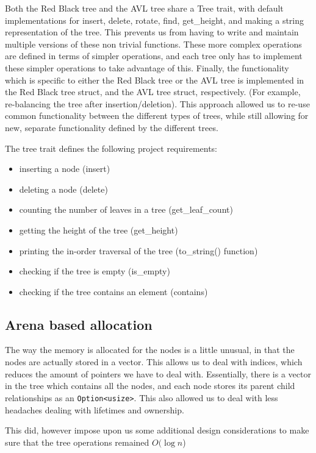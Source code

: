 \documentclass[letterpaper]{article}
\begin{document}
Both the Red Black tree and the AVL tree share a Tree trait, with
default implementations for insert, delete, rotate, find, get\_height,
and making a string representation of the tree. This prevents us from
having to write and maintain multiple versions of these non trivial
functions. These more complex operations are defined in terms of
simpler operations, and each tree only has to implement these simpler
operations to take advantage of this. Finally, the functionality which is
specific to either the Red Black tree or the AVL tree is implemented
in the Red Black tree struct, and the AVL tree struct, respectively.
(For example, re-balancing the tree after insertion/deletion).  This
approach allowed us to re-use common functionality between the
different types of trees, while still allowing for new, separate
functionality defined by the different trees.

The tree trait defines the following project requirements:

\begin{itemize}
	\item inserting a node (insert)
	\item deleting a node (delete)
	\item counting the number of leaves in a tree (get\_leaf\_count)
	\item getting the height of the tree (get\_height)
	\item printing the in-order traversal of the tree (to\_string()
	      function)
	\item checking if the tree is empty (is\_empty)
	\item checking if the tree contains an element (contains)
\end{itemize}

\subsection{Arena based allocation}
The way the memory is allocated for the nodes is a little unusual, in that the
nodes are actually stored in a vector. This allows us to deal with indices,
which reduces the amount of pointers we have to deal with. Essentially, there is
a vector in the tree which contains all the nodes, and each node stores its
parent child relationships as an \texttt{Option<usize>}. This also allowed us to
deal with less headaches dealing with lifetimes and ownership.

This did, however impose upon us some additional design considerations
to make sure that the tree operations remained \(O(\log n\))
\end{document}
